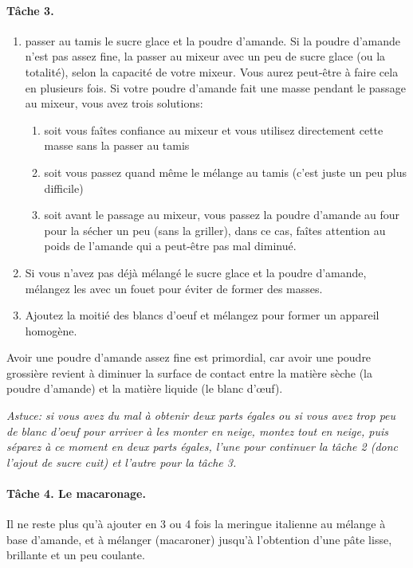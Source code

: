\documentclass[a4paper]{article}
\begin{document}
\paragraph{Tâche 3.}

\begin{enumerate}
\item passer au tamis le sucre glace et la poudre d'amande.
  Si la poudre d'amande n'est pas assez fine, la passer au mixeur avec 
  un peu de sucre glace (ou la totalité), selon la capacité de votre mixeur.
  Vous aurez peut-être à faire cela en plusieurs fois.
  Si votre poudre d'amande fait une masse pendant le passage au mixeur, 
  vous avez trois solutions:
  \begin{enumerate}
  \item soit vous faîtes confiance au mixeur et vous utilisez
    directement cette masse sans la passer au tamis
  \item soit vous passez quand même le mélange au tamis (c'est juste
    un peu plus difficile)
  \item  soit  avant le  passage  au  mixeur,  vous passez  la  poudre
    d'amande au four pour la sécher  un peu (sans la griller), dans ce
    cas, faîtes attention au poids de l'amande qui a peut-être pas mal
    diminué.
  \end{enumerate}
\item Si vous n'avez pas déjà mélangé le sucre glace et la poudre d'amande,
  mélangez les avec un fouet pour éviter de former des masses.
\item Ajoutez la  moitié des blancs d'oeuf et  mélangez pour former un
  appareil homogène.
\end{enumerate}

Avoir une poudre d'amande assez fine est primordial, car avoir une poudre
grossière revient à diminuer la surface de contact entre la matière 
sèche (la poudre d'amande)  et la matière liquide (le blanc d'œuf).


\emph{Astuce: si vous avez du mal à obtenir deux parts égales ou si
  vous avez trop peu de blanc d'oeuf pour arriver à les monter en
  neige, montez tout en neige, puis séparez à ce moment en deux parts
  égales, l'une pour continuer la tâche 2 (donc l'ajout de sucre cuit)
  et l'autre pour la tâche 3. }


\paragraph{Tâche 4. Le macaronage.}
Il ne reste plus qu'à ajouter en  3 ou 4 fois la meringue italienne au
mélange à base d'amande, et à mélanger (macaroner) jusqu'à l'obtention
d'une pâte lisse, brillante et un peu coulante.
\end{document}
